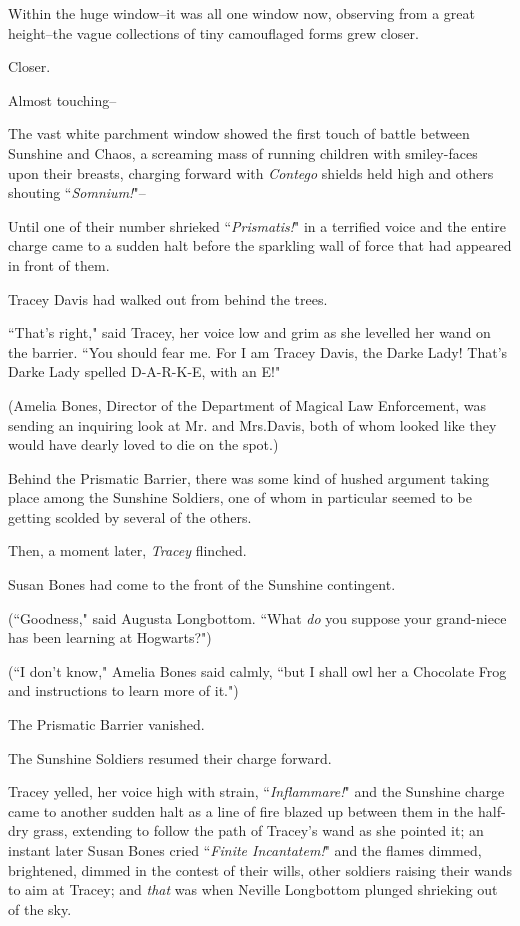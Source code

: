 Within the huge window\---it was all one window now, observing from a great height\---the vague collections of tiny camouflaged forms grew closer.

Closer.

Almost touching\---

\later

The vast white parchment window showed the first touch of battle between Sunshine and Chaos, a screaming mass of running children with smiley-faces upon their breasts, charging forward with \emph{Contego} shields held high and others shouting ``\emph{Somnium!}"\---

Until one of their number shrieked ``\emph{Prismatis!}" in a terrified voice and the entire charge came to a sudden halt before the sparkling wall of force that had appeared in front of them.

Tracey Davis had walked out from behind the trees.

``That's right," said Tracey, her voice low and grim as she levelled her wand on the barrier. ``You should fear me. For I am Tracey Davis, the Darke Lady! That's Darke Lady spelled D-A-R-K-E, with an E!"

(Amelia Bones, Director of the Department of Magical Law Enforcement, was sending an inquiring look at Mr. and Mrs.\?Davis, both of whom looked like they would have dearly loved to die on the spot.)

Behind the Prismatic Barrier, there was some kind of hushed argument taking place among the Sunshine Soldiers, one of whom in particular seemed to be getting scolded by several of the others.

Then, a moment later, \emph{Tracey} flinched.

Susan Bones had come to the front of the Sunshine contingent.

(``Goodness," said Augusta Longbottom. ``What \emph{do} you suppose your grand-niece has been learning at Hogwarts?")

(``I don't know," Amelia Bones said calmly, ``but I shall owl her a Chocolate Frog and instructions to learn more of it.")

The Prismatic Barrier vanished.

The Sunshine Soldiers resumed their charge forward.

Tracey yelled, her voice high with strain, ``\emph{Inflammare!}" and the Sunshine charge came to another sudden halt as a line of fire blazed up between them in the half-dry grass, extending to follow the path of Tracey's wand as she pointed it; an instant later Susan Bones cried ``\emph{Finite Incantatem!}" and the flames dimmed, brightened, dimmed in the contest of their wills, other soldiers raising their wands to aim at Tracey; and \emph{that} was when Neville Longbottom plunged shrieking out of the sky.


